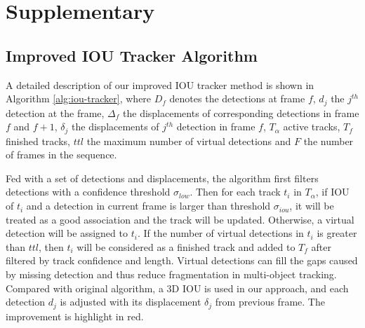 \documentclass{bmvc2k}
\begin{document}
	
\section*{Supplementary}

\subsection{Improved IOU Tracker Algorithm}
A detailed description of our improved IOU tracker method is shown in Algorithm \ref{alg:iou-tracker}, where $D_f$ denotes the detections at frame $f$, $d_j$ the $j^{th}$ detection at the frame, $\Delta_f$ the displacements of corresponding detections in frame $f$ and $f+1$, $\delta_j$ the displacements of $j^{th}$ detection in frame $f$, $T_{\alpha}$ active tracks, $T_f$ finished tracks, $ttl$ the maximum number of virtual detections and $F$ the number of frames in the sequence. 

Fed with a set of detections and displacements, the algorithm first filters detections with a confidence threshold $\sigma_{low}$. Then for each track $t_i$ in $T_{\alpha}$, if IOU of $t_i$ and a detection in current frame is larger than threshold $\sigma_{iou}$, it will be treated as a good association and the track will be updated. Otherwise, a virtual detection will be assigned to $t_i$. If the number of virtual detections in $t_i$ is greater than $ttl$, then $t_i$ will be considered as a finished track and added to $T_f$ after filtered by track confidence and length. Virtual detections can fill the gaps caused by missing detection and thus reduce fragmentation in multi-object tracking. Compared with original algorithm, a 3D IOU is used in our approach, and each detection $d_j$ is adjusted with its displacement $\delta_j$ from previous frame. The improvement is highlight in red.
\end{document}
